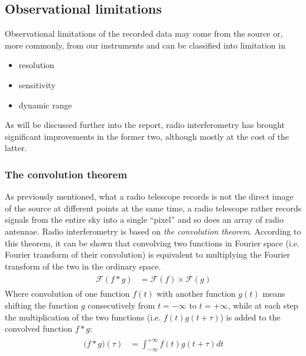 \documentclass[paper=a4, fontsize=11pt]{scrartcl} %
\numberwithin{equation}{section} %
\numberwithin{figure}{section} %
\numberwithin{table}{section} %
\begin{document}
\subsection{Observational limitations}
Observational limitations of the recorded data may come from the source or, more commonly, from our instruments and can be classified into limitation in 
\begin{itemize}
\item resolution
\item sensitivity
\item dynamic range
\end{itemize}
As will be discussed further into the report, radio interferometry has brought significant improvements in the former two, although mostly at the cost of the latter.

\subsubsection*{The convolution theorem}
As previously mentioned, what a radio telescope records is not the direct image of the source at different points at the same time, a radio telescope rather records signals from the entire sky into a single ``pixel'' and so does an array of radio antennae. Radio interferometry is based on \emph{the convolution theorem}. According to this theorem, it can be shown that convolving two functions in Fourier space (i.e. Fourier transform of their convolution) is equivalent to multiplying the Fourier transform of the two in the ordinary space.
\begin{align} 
\begin{split}
\mathcal{F}(f*g) &= \mathcal{F}(f) \times \mathcal{F}(g)
\end{split}                    
\end{align}
Where convolution of one function $f(t)$ with another function $g(t)$ means shifting the function $g$ consecutively from $t=-\infty$ to $t=+\infty$, while at each step the multiplication of the two functions (i.e. $f(t)g(t+\tau)$) is added to the convolved function $f*g$:
\begin{align} 
\begin{split}
\mathcal (f*g)(\tau) &= \int_{-\infty}^{+\infty} f(t)g(t+\tau) dt
\end{split}                    
\end{align}
\end{document}
